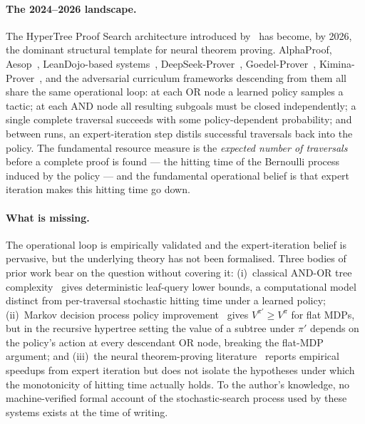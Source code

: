 \documentclass[reqno,11pt]{amsart}
\theoremstyle{plain}
\theoremstyle{definition}
\theoremstyle{remark}
\begin{document}
\paragraph{The 2024--2026 landscape.} The HyperTree Proof Search architecture introduced by~\citet{Lample2022} has become, by 2026, the dominant structural template for neural theorem proving. AlphaProof, Aesop~\citep{Aesop2023}, LeanDojo-based systems~\citep{LeanDojo2023,Llemma2023}, DeepSeek-Prover~\citep{DeepSeekProver2024}, Goedel-Prover~\citep{GoedelProver2025}, Kimina-Prover~\citep{KiminaProver2025}, and the adversarial curriculum frameworks descending from them all share the same operational loop: at each OR node a learned policy samples a tactic; at each AND node all resulting subgoals must be closed independently; a single complete traversal succeeds with some policy-dependent probability; and between runs, an expert-iteration step distils successful traversals back into the policy. The fundamental resource measure is the \emph{expected number of traversals} before a complete proof is found --- the hitting time of the Bernoulli process induced by the policy --- and the fundamental operational belief is that expert iteration makes this hitting time go down.

\paragraph{What is missing.} The operational loop is empirically validated and the expert-iteration belief is pervasive, but the underlying theory has not been formalised. Three bodies of prior work bear on the question without covering it: (i)~classical AND-OR tree complexity~\citep{Pearl1982,Tarsi1983,SaksWigderson1986,Snir1985} gives deterministic leaf-query lower bounds, a computational model distinct from per-traversal stochastic hitting time under a learned policy; (ii)~Markov decision process policy improvement~\citep{Bellman1957,Puterman1994,SuttonBarto2018} gives $V^{\pi'}\ge V^{\pi}$ for flat MDPs, but in the recursive hypertree setting the value of a subtree under $\pi'$ depends on the policy's action at every descendant OR node, breaking the flat-MDP argument; and (iii)~the neural theorem-proving literature~\citep{PoluHan2020,Han2021,Lample2022,DeepSeekProver2024,GoedelProver2025,KiminaProver2025} reports empirical speedups from expert iteration but does not isolate the hypotheses under which the monotonicity of hitting time actually holds. To the author's knowledge, no machine-verified formal account of the stochastic-search process used by these systems exists at the time of writing.
\end{document}
